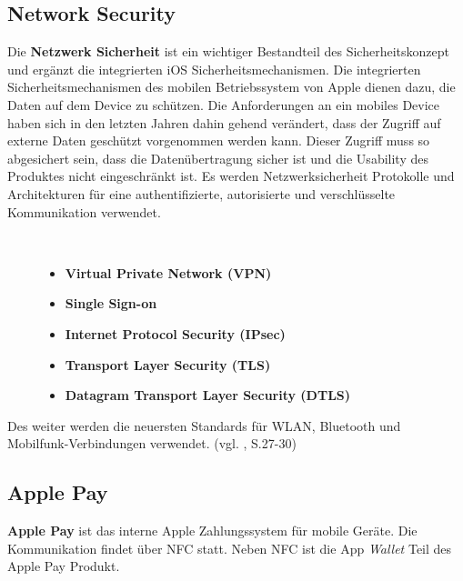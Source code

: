 \subsection{Network Security}
\label{sec:NetworkSec}
Die \textbf{ Netzwerk Sicherheit} ist ein wichtiger Bestandteil des Sicherheitskonzept und ergänzt die integrierten iOS Sicherheitsmechanismen. Die integrierten Sicherheitsmechanismen des mobilen Betriebssystem von Apple dienen dazu, die Daten auf dem Device zu schützen. Die Anforderungen an ein mobiles Device haben sich in den letzten Jahren dahin gehend verändert, dass der Zugriff auf externe Daten geschützt vorgenommen werden kann. Dieser Zugriff muss so abgesichert sein, dass die Datenübertragung sicher ist und die Usability des Produktes nicht eingeschränkt ist. Es werden Netzwerksicherheit Protokolle und Architekturen für eine authentifizierte, autorisierte und verschlüsselte Kommunikation verwendet.
\begin{description}
\item[\parbox{\textwidth} {Ein iOS Device verfügt über folgende Netzwerksicherheit Protokolle und Architekturen
an}]~\par
	\begin{itemize}
		\item \textbf{Virtual Private Network (VPN)}
 		\item \textbf{Single Sign-on}
 		\item \textbf{Internet Protocol Security (IPsec)}
 		\item \textbf{Transport Layer Security (TLS)} %
		\item \textbf{Datagram Transport Layer Security (DTLS)}
        \end{itemize}
\end{description}
Des weiter werden die neuersten Standards für WLAN, Bluetooth und Mobilfunk-Verbindungen verwendet. (vgl. \cite{Apple[4]}, S.27-30)

\subsection{Apple Pay}
\label{sec:ApplePay}

\textbf{Apple Pay} ist das interne Apple Zahlungssystem für mobile Geräte. Die Kommunikation findet über NFC statt. Neben NFC ist die App \textit{\glqq Wallet\grqq{}} Teil des Apple Pay Produkt.

